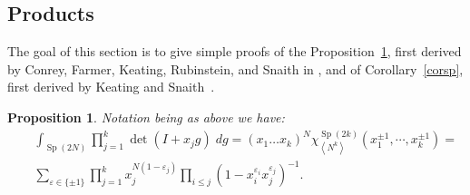 \documentclass[11pt]{amsart}
\newcommand{\tmop}[1]{\ensuremath{\operatorname{#1}}}
\newtheorem{proposition}{Proposition}
\begin{document}
\subsection{Products}

The goal of this section is to give simple proofs of the
Proposition~\ref{prop:symp}, first derived by  Conrey, Farmer,
Keating, Rubinstein, and  Snaith  in \cite{CFKRS2}, and of
Corollary~\ref{corsp}, first derived by Keating and
Snaith~{\cite{KS00}}.



\begin{proposition} \label{prop:symp}Notation being as above we
  have:
  \begin{eqnarray}
    &  & \int_{\tmop{Sp} ( 2 N )} \prod_{j = 1}^k \det ( I +x_j g ) \; d g =
    ( x_1 \ldots x_k )^N \chi_{\left\langle N^k \right\rangle}^{\tmop{Sp} ( 2
    k )} ( x_1^{\pm 1}, \cdots, x_k^{\pm 1} ) = \nonumber\\
    &  & \sum_{\varepsilon \in \{ \pm 1 \}} \prod_{j = 1}^k x_j^{N ( 1 -
    \varepsilon_j )} \prod_{i \leqslant j} ( 1 - x_i^{\varepsilon_i}
    x_j^{\varepsilon_j} )^{- 1} .  \label{esymp}
  \end{eqnarray}

\end{proposition}
\end{document}
